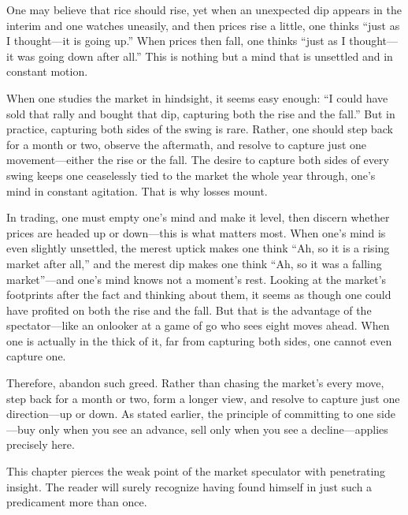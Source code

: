 
\begin{sokyubox}
{\small\itshape\color{sokyubar} }

\medskip
One may believe that rice should rise, yet when an unexpected dip
appears in the interim and one watches uneasily, and then prices rise a
little, one thinks ``just as I thought---it is going up.'' When prices
then fall, one thinks ``just as I thought---it was going down after
all.'' This is nothing but a mind that is unsettled and in constant
motion.

When one studies the market in hindsight, it seems easy enough: ``I
could have sold that rally and bought that dip, capturing both the rise
and the fall.'' But in practice, capturing both sides of the swing is
rare. Rather, one should step back for a month or two, observe the
aftermath, and resolve to capture just one movement---either the rise or
the fall. The desire to capture both sides of every swing keeps one
ceaselessly tied to the market the whole year through, one's mind in
constant agitation. That is why losses mount.
\end{sokyubox}

\commentary
In trading, one must empty one's mind and make it level, then discern
whether prices are headed up or down---this is what matters most. When
one's mind is even slightly unsettled, the merest uptick makes one think
``Ah, so it is a rising market after all,'' and the merest dip makes one
think ``Ah, so it was a falling market''---and one's mind knows not a
moment's rest. Looking at the market's footprints after the fact and
thinking about them, it seems as though one could have profited on both
the rise and the fall. But that is the advantage of the spectator---like
an onlooker at a game of go who sees eight moves ahead. When one is
actually in the thick of it, far from capturing both sides, one cannot
even capture one.

Therefore, abandon such greed. Rather than chasing the market's every
move, step back for a month or two, form a longer view, and resolve to
capture just one direction---up or down. As stated earlier, the
principle of committing to one side---buy only when you see an advance,
sell only when you see a decline---applies precisely here.

This chapter pierces the weak point of the market speculator with
penetrating insight. The reader will surely recognize having found
himself in just such a predicament more than once.

